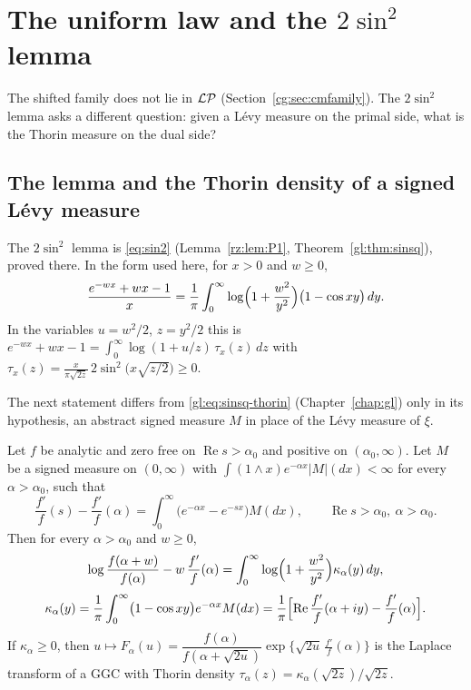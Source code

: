 \section{The uniform law and the $2\sin^2$ lemma}\label{cg:sec:uniform}

The shifted family does not lie in $\mathcal{L}\mathcal{P}$ (Section~\ref{cg:sec:cmfamily}). The $2\sin^2$ lemma asks a different question: given a L\'evy measure on the primal side, what is the Thorin measure on the dual side?

\subsection{The lemma and the Thorin density of a signed L\'evy measure}

The $2\sin^2$ lemma is \eqref{eq:sin2} (Lemma~\ref{rz:lem:P1}, Theorem~\ref{gl:thm:sinsq}), proved there. In the form used here, for $x>0$ and $w\ge0$,
\begin{equation}\label{cg:eq:twosiny}
\frac{e^{-wx}+wx-1}{x}=\frac1\pi\int_0^\infty\log\Bigl(1+\frac{w^2}{y^2}\Bigr)\bigl(1-\cos xy\bigr)\,dy .
\end{equation}
In the variables $u=w^2/2$, $z=y^2/2$ this is $e^{-wx}+wx-1=\int_0^\infty\log(1+u/z)\,\tau_x(z)\,dz$ with $\tau_x(z)=\frac{x}{\pi\sqrt{2z}}\,2\sin^2\bigl(x\sqrt{z/2}\bigr)\ge0$.

The next statement differs from \eqref{gl:eq:sinsq-thorin} (Chapter~\ref{chap:gl}) only in its hypothesis, an abstract signed measure $M$ in place of the L\'evy measure of $\xi$.

\begin{theorem}\label{cg:thm:thorinfromlevy}
Let $f$ be analytic and zero free on $\operatorname{Re}s>\alpha_0$ and positive on $(\alpha_0,\infty)$. Let $M$ be a signed measure on $(0,\infty)$ with $\int(1\wedge x)e^{-\alpha x}|M|(dx)<\infty$ for every $\alpha>\alpha_0$, such that
\begin{equation}\label{cg:eq:levyk}
\frac{f'}{f}(s)-\frac{f'}{f}(\alpha)=\int_0^\infty\bigl(e^{-\alpha x}-e^{-sx}\bigr)M(dx),\qquad \operatorname{Re}s>\alpha_0,\ \alpha>\alpha_0 .
\end{equation}
Then for every $\alpha>\alpha_0$ and $w\ge0$,
\begin{equation}\label{cg:eq:thorinrep}
\log\frac{f(\alpha+w)}{f(\alpha)}-w\,\frac{f'}{f}(\alpha)=\int_0^\infty\log\Bigl(1+\frac{w^2}{y^2}\Bigr)\kappa_\alpha(y)\,dy,
\end{equation}
\begin{equation}\label{cg:eq:kappa}
\kappa_\alpha(y)=\frac1\pi\int_0^\infty\bigl(1-\cos xy\bigr)e^{-\alpha x}M(dx)=\frac1\pi\Bigl[\operatorname{Re}\frac{f'}{f}(\alpha+iy)-\frac{f'}{f}(\alpha)\Bigr].
\end{equation}
If $\kappa_\alpha\ge0$, then $u\mapsto F_\alpha(u)=\dfrac{f(\alpha)}{f(\alpha+\sqrt{2u})}\exp\bigl\{\sqrt{2u}\,\frac{f'}{f}(\alpha)\bigr\}$ is the Laplace transform of a GGC with Thorin density $\tau_\alpha(z)=\kappa_\alpha(\sqrt{2z})/\sqrt{2z}$.
\end{theorem}

